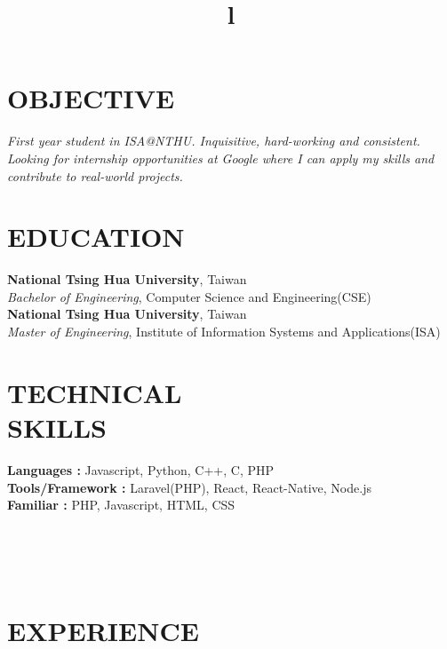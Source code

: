 \documentclass[margin]{res}
\begin{document}
\begin{resume}
\section{OBJECTIVE}
{\sl First year student in ISA@NTHU. Inquisitive, hard-working and consistent. Looking for internship opportunities at Google where I can apply my skills and contribute to real-world projects. }

\section{EDUCATION}
\textbf{National Tsing Hua University}, Taiwan\\
{\sl Bachelor of Engineering}, Computer Science and Engineering(CSE)\\
\textbf{National Tsing Hua University}, Taiwan \\
{\sl Master of Engineering}, Institute of Information Systems and Applications(ISA) 
\section{TECHNICAL\\SKILLS}

\textbf{Languages : } Javascript, Python, C++, C, PHP
\\
\textbf{Tools/Framework : } Laravel(PHP), React, React-Native, Node.js
\\
\textbf{Familiar : } PHP, Javascript, HTML, CSS

\begin{format}
\title{l}\\
\\
\body\\
\end{format}

\section{EXPERIENCE}


\end{resume}
\end{document}
